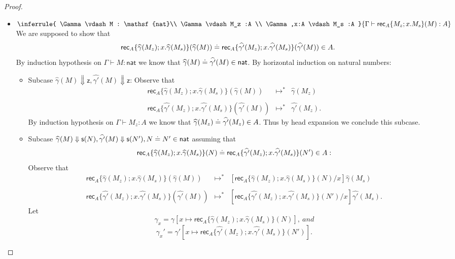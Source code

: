 \documentclass{article}
\newcommand{\G}{\Gamma}
\newcommand{\entails}{\vdash}
\newcommand{\tnat}{\mathsf{nat}}
\newcommand{\ez}{\mathsf{z}}
\newcommand{\es}[1]{\mathsf{s}(#1)}
\newcommand{\erec}[5]{\mathsf{rec}_{#1}\{#2;#3.#4\}(#5)}
\newcommand{\evalto}{\Downarrow}
\newcommand{\stepto}{\mapsto}
\begin{document}
\begin{proof}
\begin{itemize}
    \item $\inferrule{ \G \entails M : \tnat \\ \G \entails M_z :A \\ \G,x:A \entails M_s :A }{ \G \entails \erec{A}{M_z}{x}{M_s}{M} : A }$\\
    We are supposed to show that
    \[
    \erec{A}{\widehat{\gamma}(M_z)}{x}{\widehat{\gamma}(M_s)}{\widehat{\gamma}(M)} \eeq \erec{A}{\widehat{\gamma'}(M_z)}{x}{\widehat{\gamma'}(M_s)}{\widehat{\gamma'}(M)} \in A.
    \]
    By induction hypothesis on $\G \entails M : \tnat$ we know that $\widehat{\gamma}(M) \eeq \widehat{\gamma'}(M) \in \tnat$.
    By horizontal induction on natural numbers:
    \begin{itemize}
        \item Subcase $\widehat{\gamma}(M) \evalto \ez, \widehat{\gamma'}(M) \evalto \ez$:
        Observe that
        \[
        \begin{array}{rcl}
        \erec{A}{\widehat{\gamma}(M_z)}{x}{\widehat{\gamma}(M_s)}{\widehat{\gamma}(M)} & \stepto^* & \widehat{\gamma}(M_z) \\\\
        \erec{A}{\widehat{\gamma'}(M_z)}{x}{\widehat{\gamma'}(M_s)}{\widehat{\gamma'}(M)} & \stepto^* & \widehat{\gamma'}(M_z).
        \end{array}
        \]
        By induction hypothesis on $\G \entails M_z : A$ we know that $\widehat{\gamma}(M_z) \doteq \widehat{\gamma'}(M_z) \in A$.
        Thus by head expansion we conclude this subcase.
        \item Subcase $\widehat{\gamma}(M) \evalto \es{N}, \widehat{\gamma'}(M) \evalto \es{N'}, N \eeq N' \in \tnat$ assuming that
        \[
        \erec{A}{\widehat{\gamma}(M_z)}{x}{\widehat{\gamma}(M_s)}{N} \eeq \erec{A}{\widehat{\gamma'}(M_z)}{x}{\widehat{\gamma'}(M_s)}{N'} \in A:
        \]
        Observe that
        \[
        \begin{array}{rcl}
        \erec{A}{\widehat{\gamma}(M_z)}{x}{\widehat{\gamma}(M_s)}{\widehat{\gamma}(M)} & \stepto^* & [\erec{A}{\widehat{\gamma}(M_z)}{x}{\widehat{\gamma}(M_s)}{N}/x]\widehat{\gamma}(M_s) \\\\
        \erec{A}{\widehat{\gamma'}(M_z)}{x}{\widehat{\gamma'}(M_s)}{\widehat{\gamma'}(M)} & \stepto^* & [\erec{A}{\widehat{\gamma'}(M_z)}{x}{\widehat{\gamma'}(M_s)}{N'}/x]\widehat{\gamma'}(M_s).
        \end{array}
        \]
        Let $$\gamma_x = \gamma[x \mapsto \erec{A}{\widehat{\gamma}(M_z)}{x}{\widehat{\gamma}(M_s)}{N}],\ and$$ $$\gamma_x' = \gamma'[x \mapsto \erec{A}{\widehat{\gamma'}(M_z)}{x}{\widehat{\gamma'}(M_s)}{N'}].$$

\end{itemize}
\end{itemize}
\end{proof}
\end{document}
